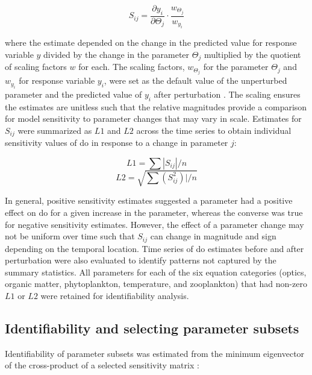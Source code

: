 \documentclass[letterpaper,12pt,oneside]{article}\usepackage[]{graphicx}\usepackage[]{color}
\begin{document}
\begin{equation} \label{sijeqn}
S_{ij} = \frac{\partial y_i}{\partial \Theta_j}\cdot\frac{w_{\Theta_j}}{w_{y_i}}
\end{equation}

\noindent where the estimate depended on the change in the predicted value for response variable $y$ divided by the change in the parameter $\Theta_j$ multiplied by the quotient of scaling factors $w$ for each.  The scaling factors, $w_{\Theta_j}$ for the parameter $\Theta_j$ and $w_{y_i}$ for response variable $y_i$, were set as the default value of the unperturbed parameter and the predicted value of $y_i$ after perturbation \citep{Soetaert10}.  The scaling ensures the estimates are unitless such that the relative magnitudes provide a comparison for model sensitivity to parameter changes that may vary in scale.  Estimates for $S_{ij}$ were summarized as $L1$ and $L2$ across the time series to obtain individual sensitivity values of \ac{do} in response to a change in parameter $j$:

\begin{equation} \label{l1}
L1 = \sum|S_{ij}|/n
\end{equation}
\begin{equation} \label{l2}
L2 = \sqrt{\sum\left(S_{ij}^2\right)|/n}
\end{equation}

In general, positive sensitivity estimates suggested a parameter had a positive effect on \ac{do} for a given increase in the parameter, whereas the converse was true for negative sensitivity estimates.  However, the effect of a parameter change may not be uniform over time such that $S_{ij}$ can change in magnitude and sign depending on the temporal location.  Time series of \ac{do} estimates before and after perturbation were also evaluated to identify patterns not captured by the summary statistics. All parameters for each of the six equation categories (optics, organic matter, phytoplankton, temperature, and zooplankton) that had non-zero $L1$ or $L2$ were retained for identifiability analysis.  

\subsection{Identifiability and selecting parameter subsets}

Identifiability of parameter subsets was estimated from the minimum eigenvector of the cross-product of a selected sensitivity matrix \citep{Brun01,Omlin01}:
\end{document}
